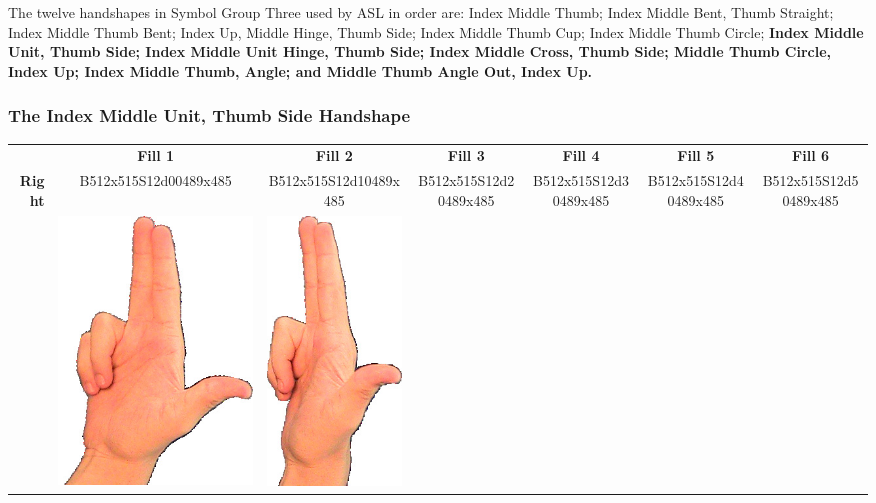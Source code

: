 \documentclass{article}
\begin{document}
The twelve handshapes in Symbol Group Three used by ASL in order are:
Index Middle Thumb;
Index Middle Bent, Thumb Straight;
Index Middle Thumb Bent;
Index Up, Middle Hinge, Thumb Side;
Index Middle Thumb Cup;
Index Middle Thumb Circle;
{\bf
Index Middle Unit, Thumb Side;
Index Middle Unit Hinge, Thumb Side;
Index Middle Cross, Thumb Side;
Middle Thumb Circle, Index Up;
Index Middle Thumb, Angle;
and Middle Thumb Angle Out, Index Up.
}

\subsubsection{The Index Middle Unit, Thumb Side Handshape}

\begin{center}
\begin{tabular}{r*{6}{c}}
&\textbf{Fill 1}&\textbf{Fill 2}&\textbf{Fill 3}&\textbf{Fill 4}&\textbf{Fill 5}&\textbf{Fill 6}\\
\multirow{2}{*}{\textbf{Right}}&
B512x515S12d00489x485&
B512x515S12d10489x485&
B512x515S12d20489x485&
B512x515S12d30489x485&
B512x515S12d40489x485&
B512x515S12d50489x485\\
&
\includegraphics[scale=0.1]{images/03-07-1.jpg}&
\includegraphics[scale=0.1]{images/03-07-2.jpg}&

\end{tabular}
\end{center}
\end{document}
